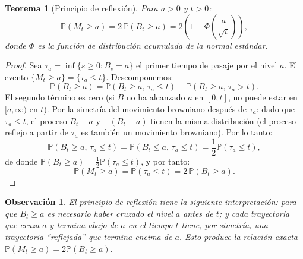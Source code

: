 \documentclass[12pt]{book}
\newtheorem{theorem}{Teorema}[chapter]
\newtheorem{remark}{Observación}[chapter]
\begin{document}
\begin{theorem}[Principio de reflexión]
\label{thm:reflexion}
Para $a > 0$ y $t > 0$:
\[
    \mathbb{P}(M_t \ge a) = 2\,\mathbb{P}(B_t \ge a) = 2\left(1 - \Phi\!\left(\frac{a}{\sqrt{t}}\right)\right),
\]
donde $\Phi$ es la función de distribución acumulada de la normal estándar.
\end{theorem}

\begin{proof}
Sea $\tau_a = \inf\{s \ge 0 : B_s = a\}$ el primer tiempo de pasaje por el nivel $a$. El evento $\{M_t \ge a\} = \{\tau_a \le t\}$. Descomponemos:
\[
    \mathbb{P}(B_t \ge a) = \mathbb{P}(B_t \ge a,\, \tau_a \le t) + \mathbb{P}(B_t \ge a,\, \tau_a > t).
\]
El segundo término es cero (si $B$ no ha alcanzado $a$ en $[0,t]$, no puede estar en $[a,\infty)$ en $t$). Por la simetría del movimiento browniano después de $\tau_a$: dado que $\tau_a \le t$, el proceso $B_t - a$ y $-(B_t - a)$ tienen la misma distribución (el proceso reflejo a partir de $\tau_a$ es también un movimiento browniano). Por lo tanto:
\[
    \mathbb{P}(B_t \ge a,\, \tau_a \le t) = \mathbb{P}(B_t \le a,\, \tau_a \le t) = \frac{1}{2}\mathbb{P}(\tau_a \le t),
\]
de donde $\mathbb{P}(B_t \ge a) = \frac{1}{2}\mathbb{P}(\tau_a \le t)$, y por tanto:
\[
    \mathbb{P}(M_t \ge a) = \mathbb{P}(\tau_a \le t) = 2\,\mathbb{P}(B_t \ge a).
\]
\end{proof}

\begin{remark}
El principio de reflexión tiene la siguiente interpretación: para que $B_t \ge a$ es necesario haber cruzado el nivel $a$ antes de $t$; y cada trayectoria que cruza $a$ y termina abajo de $a$ en el tiempo $t$ tiene, por simetría, una trayectoria ``reflejada'' que termina encima de $a$. Esto produce la relación exacta $\mathbb{P}(M_t \ge a) = 2\mathbb{P}(B_t \ge a)$.
\end{remark}
\end{document}
